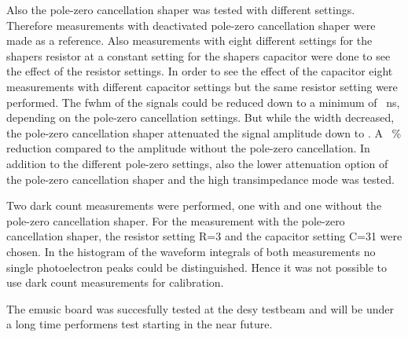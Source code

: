 Also the pole-zero cancellation shaper was tested with different settings.
Therefore measurements with deactivated pole-zero cancellation shaper were made as a reference.
Also measurements with eight different settings for the shapers resistor at a constant setting for the shapers capacitor were done to see the effect of the resistor settings.
In order to see the effect of the capacitor eight measurements with different capacitor settings but the same resistor setting were performed.
The \ac{fwhm} of the signals could be reduced down to a minimum of \SI{}{\nano\second}, depending on the pole-zero cancellation settings.
But while the width decreased, the pole-zero cancellation shaper attenuated the signal amplitude down to \SI{}{}.
A \SI{}{\percent} reduction compared to the \SI{}{} amplitude without the pole-zero cancellation.
In addition to the different pole-zero settings, also the lower attenuation option of the pole-zero cancellation shaper and the high transimpedance mode was tested.

Two dark count measurements were performed, one with and one without the pole-zero cancellation shaper.
For the measurement with the pole-zero cancellation shaper, the resistor setting R=3 and the capacitor setting C=31 were chosen.
In the histogram of the waveform integrals of both measurements no single photoelectron peaks could be distinguished.
Hence it was not possible to use dark count measurements for calibration.

The \ac{emusic} board was succesfully tested at the \ac{desy} testbeam and will be under a long time performens test starting in the near future.
